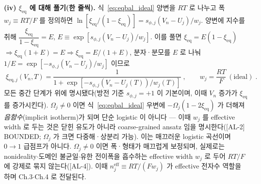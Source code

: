 \documentclass[11pt,a4paper]{article}
\newcommand{\eff}{\mathrm{eff}}
\newcommand{\eq}{\mathrm{eq}}
\newcommand{\AL}[1]{\textsf{[AL-#1]}}
\begin{document}
\textbf{(iv) $\xi_\eq$ 에 대해 풀기(한 줄씩).} 식~\eqref{eq:eqbal_ideal} 양변을 $RT$ 로 나누고 폭
$w_j\equiv RT/F$ 를 정의하면 $\ln[\xi_\eq/(1-\xi_\eq)]=s_{\phi,j}(V_n-U_j)/w_j$. 양변에 지수를 취해
$\dfrac{\xi_\eq}{1-\xi_\eq}=E$, $E\equiv\exp[s_{\phi,j}(V_n-U_j)/w_j]$. 이를 풀면 $\xi_\eq=E(1-\xi_\eq)$
$\Rightarrow\xi_\eq(1+E)=E\Rightarrow\xi_\eq=E/(1+E)$, 분자·분모를 $E$ 로 나눠 $1/E=\exp[-s_{\phi,j}(V_n-U_j)/w_j]$
이므로
\begin{equation}
\boxed{\;\xi_{\eq,j}(V_n,T)=\frac{1}{1+\exp[-s_{\phi,j}(V_n-U_j(T))/w_j(T)]}\;,\qquad w_j=\frac{RT}{F}\ (\text{ideal})\;.}
\label{eq:logistic}
\end{equation}
모든 중간 단계가 위에 명시됐다(방전 기준 $s_{\phi,j}=+1$ 이 기본이며, 이때 $V_n$ 증가가 $\xi_\eq$ 를 증가시킨다).
$\Omega_j\ne0$ 이면 식~\eqref{eq:eqbal_ideal} 우변에 $-\Omega_j(1-2\xi_\eq)$ 가 더해져 \emph{음함수}(implicit
isotherm)가 되며 단순 logistic 이 아니다 — 이때 $w_j$ 를 effective width 로 두는 것은 닫힌 유도가 아니라
coarse-grained ansatz 임을 명시한다(\AL{2} BOUNDED; $\Omega_j$ 가 크면 다중해·상분리 가능). 이는 매끄러운 logistic 곡선이며 $0\!\to\!1$ 급점프가
아니다. $\Omega_j\ne0$ 이면 폭·형태가 매끄럽게 보정되며, 실제로는 nonideality$\cdot$도메인 불균일$\cdot$유한
전이폭을 흡수하는 effective width $w_j$ 로 두어 $RT/F$ 에 강제로 묶지 않는다(\AL{4}). 이때
$n_j^{\eff}\equiv RT/(Fw_j)$ 가 effective 전자수 역할을 하며 Ch.3$\cdot$Ch.4 로 전달된다.
\end{document}
